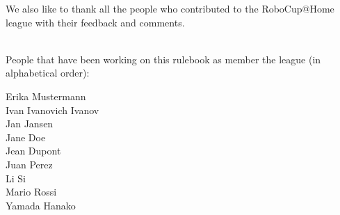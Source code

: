 We also like to thank all the people who contributed to the RoboCup@Home league with their feedback and comments. 

~\\\noindent People that have been working on this rulebook as member the league (in alphabetical order):
\begin{multicols}{3}%
\noindent%
Erika Mustermann\\%
Ivan Ivanovich Ivanov\\%
\columnbreak%
Jan Jansen\\%
Jane Doe\\%
Jean Dupont\\%
\columnbreak%
Juan Perez\\%
Li Si\\%
Mario Rossi\\%
Yamada Hanako\\%
\end{multicols}

